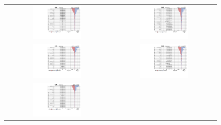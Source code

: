  \begin{figure}[tbh!]
 \begin{center}
 \begin{tabular}{cc}
 \includegraphics[width=0.48\textwidth]{figures/Appendix/Impact/Impact_TensorC_expected0}&
  \includegraphics[width=0.48\textwidth]{figures/Appendix/Impact/Impact_TensorC}\\
   \includegraphics[width=0.48\textwidth]{figures/Appendix/Impact/Impact_VecC_expected0}&
  \includegraphics[width=0.48\textwidth]{figures/Appendix/Impact/Impact_VecC}\\
   \includegraphics[width=0.48\textwidth]{figures/Appendix/Impact/Impact_ScalarC_expected0}&

\end{tabular}
\end{center}
\end{figure}
